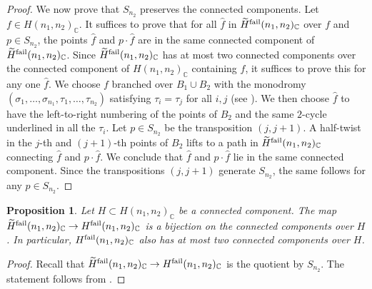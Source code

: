 \documentclass{amsart}
\numberwithin{equation}{section} \numberwithin{figure}{section}
\newcommand\CC{\mathbb{C}}
\theoremstyle{one}
\newtheorem{proposition}[theorem]{\textbf{Proposition}}
\theoremstyle{definition}
\begin{document}
\begin{proof}
We now prove that \(S_{n_2}\) preserves the connected components.
Let \(f \in H(n_1,n_2)_{\CC}\).
It suffices to prove that for all \(\hat{f}\) in \(\widetilde H^{\rm fail}(n_1,n_2)_{\CC}\) over \(f\) and \(p \in S_{n_2}\), the points \(\hat{f}\) and \(p \cdot \hat{f}\) are in the same connected component of \(\widetilde H^{\rm fail}(n_1,n_2)_{\CC}\).
Since \(\widetilde H^{\rm fail}(n_1,n_2)_{\CC}\) has at most two connected components over the connected component of \(H(n_1,n_2)_{\CC}\) containing \(f\), it suffices to prove this for any one \(\hat{f}\).
We choose \(f\) branched over \(B_1\cup B_2\) with the monodromy \((\sigma_1, \dots, \sigma_{n_1}, \tau_1, \dots, \tau_{n_2})\) satisfying \(\tau_i = \tau_j\) for all \(i,j\) (see ).
We then choose \(\hat{f}\) to have the left-to-right numbering of the points of \(B_2\) and the same \(2\)-cycle underlined in all the \(\tau_i\).
Let \(p \in S_{n_2}\) be the transposition \((j,j+1)\).
A half-twist in the \(j\)-th and \((j+1)\)-th points of \(B_2\) lifts to a path in \(\widetilde H^{\rm fail}(n_1,n_2)_{\CC}\) connecting \(\hat{f}\) and \(p \cdot \hat{f}\). 
We conclude that \(\hat{f}\) and \(p \cdot \hat{f}\) lie in the same connected component.
Since the transpositions \((j,j+1)\) generate \(S_{n_2}\), the same follows for any \(p \in S_{n_2}\).
\end{proof}

\begin{proposition}\label{prop:comp-hfail}
  Let \(H \subset H(n_1,n_2)_{\CC}\) be a connected component.
  The map \(\widetilde H^{\rm fail}(n_1,n_2)_{\CC} \to H^{\rm fail}(n_1,n_2)_{\CC}\) is a bijection on the connected components over \(H\).
  In particular, \(H^{\rm fail}(n_1,n_2)_{\CC}\) also has at most two connected components over \(H\).
\end{proposition}
\begin{proof}
  Recall that \(\widetilde H^{\rm fail}(n_1,n_2)_{\CC} \to H^{\rm fail}(n_1,n_2)_{\CC}\) is the quotient by \(S_{n_2}\).
  The statement follows from .
\end{proof}
\end{document}
